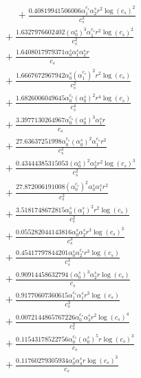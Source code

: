 \documentclass[10pt]{article}
\begin{document}
\begin{align*}
\phantom{R_{1,7}} &\phantom{={}}{}  + \frac{0.40819941506006 \alpha_{1}^{c_s} \alpha_{2}^s r^{2} \log{\left(c_{s} \right)}^{2}}{c_{s}^{2}} \\
&{}  + \frac{1.6327976602402 \left(\alpha_{0}^s\right)^{3} \alpha_{1}^{c_s} r^{2} \log{\left(c_{s} \right)}^{2}}{c_{s}^{2}} \\
&{}  + \frac{1.6408017979371 \alpha_{0}^s \alpha_{1}^s \alpha_{2}^s r}{c_{s}} \\
&{}  + \frac{1.6667672967942 \alpha_{0}^s \left(\alpha_{1}^{c_s}\right)^{2} r^{2} \log{\left(c_{s} \right)}}{c_{s}^{2}} \\
&{}  + \frac{1.6826006049645 \alpha_{0}^{c_s} \left(\alpha_{0}^s\right)^{2} r^{4} \log{\left(c_{s} \right)}}{c_{s}^{4}} \\
&{}  + \frac{3.3977130264967 \alpha_{0}^{c_s} \left(\alpha_{0}^s\right)^{3} \alpha_{1}^s r}{c_{s}} \\
&{}  + \frac{27.63637251998 \alpha_{0}^{c_s} \left(\alpha_{0}^s\right)^{2} \alpha_{1}^{c_s} r^{2}}{c_{s}^{2}} \\
&{}  + \frac{0.43444385315053 \left(\alpha_{0}^s\right)^{2} \alpha_{2}^s r^{2} \log{\left(c_{s} \right)}^{3}}{c_{s}^{2}} \\
&{}  + \frac{27.872006191008 \left(\alpha_{0}^{c_s}\right)^{2} \alpha_{0}^s \alpha_{1}^s r^{2}}{c_{s}^{2}} \\
&{}  + \frac{3.5181748672815 \alpha_{0}^s \left(\alpha_{1}^s\right)^{2} r^{2} \log{\left(c_{s} \right)}}{c_{s}^{2}} \\
&{}  + \frac{0.055282044143816 \alpha_{0}^s \alpha_{2}^s r^{3} \log{\left(c_{s} \right)}^{3}}{c_{s}^{3}} \\
&{}  + \frac{0.45417797844201 \alpha_{0}^s \alpha_{2}^{c_s} r^{3} \log{\left(c_{s} \right)}}{c_{s}^{3}} \\
&{}  + \frac{0.90914458632794 \left(\alpha_{0}^s\right)^{3} \alpha_{2}^s r \log{\left(c_{s} \right)}}{c_{s}} \\
&{}  + \frac{0.91770607360615 \alpha_{1}^{c_s} \alpha_{1}^s r^{3} \log{\left(c_{s} \right)}}{c_{s}^{3}} \\
&{}  + \frac{0.0072144865767226 \alpha_{0}^{c_s} \alpha_{3}^s r^{2} \log{\left(c_{s} \right)}^{4}}{c_{s}^{2}} \\
&{}  + \frac{0.11543178522756 \alpha_{0}^{c_s} \left(\alpha_{0}^s\right)^{5} r \log{\left(c_{s} \right)}^{3}}{c_{s}} \\
&{}  + \frac{0.11760279305934 \alpha_{0}^s \alpha_{4}^s r \log{\left(c_{s} \right)}^{3}}{c_{s}} \\

\end{align*}
\end{document}

